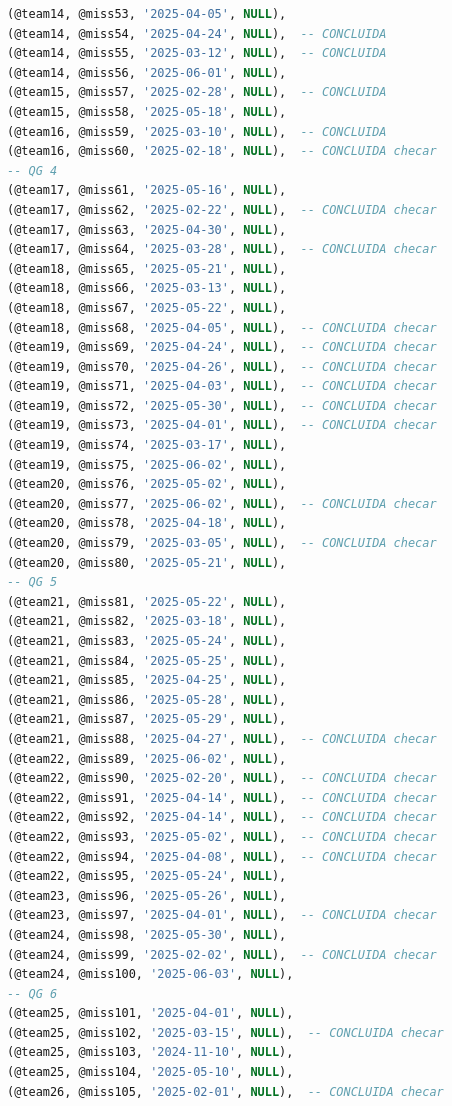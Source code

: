 \documentclass[12pt,a4paper]{report}
\begin{document}
\begin{lstlisting}[language=SQL, caption=population.sql]
(@team14, @miss53, '2025-04-05', NULL),
(@team14, @miss54, '2025-04-24', NULL),  -- CONCLUIDA 
(@team14, @miss55, '2025-03-12', NULL),  -- CONCLUIDA 
(@team14, @miss56, '2025-06-01', NULL),
(@team15, @miss57, '2025-02-28', NULL),  -- CONCLUIDA 
(@team15, @miss58, '2025-05-18', NULL),
(@team16, @miss59, '2025-03-10', NULL),  -- CONCLUIDA 
(@team16, @miss60, '2025-02-18', NULL),  -- CONCLUIDA checar
-- QG 4
(@team17, @miss61, '2025-05-16', NULL),
(@team17, @miss62, '2025-02-22', NULL),  -- CONCLUIDA checar
(@team17, @miss63, '2025-04-30', NULL),
(@team17, @miss64, '2025-03-28', NULL),  -- CONCLUIDA checar
(@team18, @miss65, '2025-05-21', NULL),
(@team18, @miss66, '2025-03-13', NULL),
(@team18, @miss67, '2025-05-22', NULL),
(@team18, @miss68, '2025-04-05', NULL),  -- CONCLUIDA checar
(@team19, @miss69, '2025-04-24', NULL),  -- CONCLUIDA checar
(@team19, @miss70, '2025-04-26', NULL),  -- CONCLUIDA checar
(@team19, @miss71, '2025-04-03', NULL),  -- CONCLUIDA checar
(@team19, @miss72, '2025-05-30', NULL),  -- CONCLUIDA checar
(@team19, @miss73, '2025-04-01', NULL),  -- CONCLUIDA checar
(@team19, @miss74, '2025-03-17', NULL),
(@team19, @miss75, '2025-06-02', NULL),
(@team20, @miss76, '2025-05-02', NULL),
(@team20, @miss77, '2025-06-02', NULL),  -- CONCLUIDA checar
(@team20, @miss78, '2025-04-18', NULL),
(@team20, @miss79, '2025-03-05', NULL),  -- CONCLUIDA checar
(@team20, @miss80, '2025-05-21', NULL),
-- QG 5
(@team21, @miss81, '2025-05-22', NULL),
(@team21, @miss82, '2025-03-18', NULL),
(@team21, @miss83, '2025-05-24', NULL),
(@team21, @miss84, '2025-05-25', NULL),
(@team21, @miss85, '2025-04-25', NULL),
(@team21, @miss86, '2025-05-28', NULL),
(@team21, @miss87, '2025-05-29', NULL),
(@team21, @miss88, '2025-04-27', NULL),  -- CONCLUIDA checar
(@team22, @miss89, '2025-06-02', NULL),
(@team22, @miss90, '2025-02-20', NULL),  -- CONCLUIDA checar
(@team22, @miss91, '2025-04-14', NULL),  -- CONCLUIDA checar
(@team22, @miss92, '2025-04-14', NULL),  -- CONCLUIDA checar
(@team22, @miss93, '2025-05-02', NULL),  -- CONCLUIDA checar
(@team22, @miss94, '2025-04-08', NULL),  -- CONCLUIDA checar
(@team22, @miss95, '2025-05-24', NULL),
(@team23, @miss96, '2025-05-26', NULL),
(@team23, @miss97, '2025-04-01', NULL),  -- CONCLUIDA checar
(@team24, @miss98, '2025-05-30', NULL),
(@team24, @miss99, '2025-02-02', NULL),  -- CONCLUIDA checar
(@team24, @miss100, '2025-06-03', NULL),
-- QG 6
(@team25, @miss101, '2025-04-01', NULL),
(@team25, @miss102, '2025-03-15', NULL),  -- CONCLUIDA checar
(@team25, @miss103, '2024-11-10', NULL),
(@team25, @miss104, '2025-05-10', NULL),
(@team26, @miss105, '2025-02-01', NULL),  -- CONCLUIDA checar

\end{lstlisting}
\end{document}
